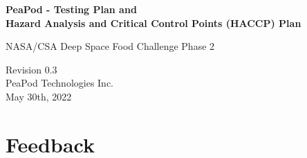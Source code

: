 \documentclass{../tex/report}
\begin{document}
\begin{titlepage}
    \begin{center}
        \vspace*{1.2cm}

        \textbf{\large{PeaPod - Testing Plan and\\Hazard Analysis and Critical Control Points (HACCP) Plan}}

        \vspace{0.5cm}

        NASA/CSA Deep Space Food Challenge Phase 2

        \vfill
        
        \vspace{.75cm}

        Revision 0.3\\
        PeaPod Technologies Inc.\\
        May 30th, 2022

    \end{center}
\end{titlepage}

\thispagestyle{plain}

\tableofcontents
\clearpage



\clearpage



\clearpage

\section{Feedback}


\clearpage



\end{document}
